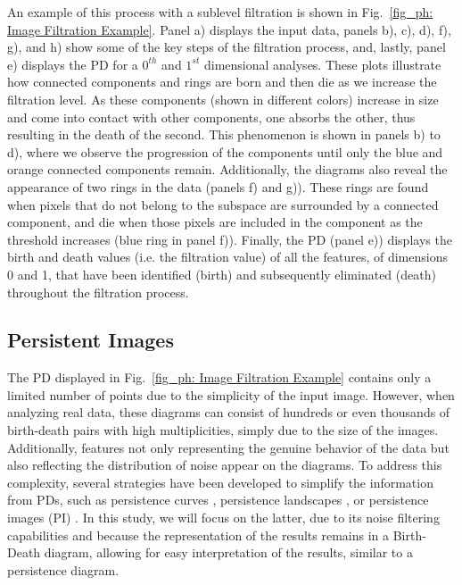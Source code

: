 \documentclass[12pt]{mythesis}
\begin{document}
An example of this process with a sublevel filtration is shown in Fig.~\ref{fig_ph: Image Filtration Example}. Panel a) displays the input data, panels b), c), d), f), g), and h) show some of the key steps of the filtration process, and, lastly, panel e) displays the PD for a $0^{th}$ and $1^{st}$ dimensional analyses. These plots illustrate how connected components and rings are born and then die as we increase the filtration level. As these components (shown in different colors) increase in size and come into contact with other components, one absorbs the other, thus resulting in the death of the second. This phenomenon is shown in panels b) to d), where we observe the progression of the components until only the blue and orange connected components remain. Additionally, the diagrams also reveal the appearance of two rings in the data (panels f) and g)). These rings are found when pixels that do not belong to the subspace are surrounded by a connected component, and die when those pixels are included in the component as the threshold increases (blue ring in panel f)). Finally, the PD (panel e)) displays the birth and death values (i.e. the filtration value) of all the features, of dimensions 0 and 1, that have been identified (birth) and subsequently eliminated (death) throughout the filtration process. 

\subsection{Persistent Images}

The PD displayed in Fig.~\ref{fig_ph: Image Filtration Example} contains only a limited number of points due to the simplicity of the input image. However, when analyzing real data, these diagrams can consist of hundreds or even thousands of birth-death pairs with high multiplicities, simply due to the size of the images. Additionally, features not only representing the genuine behavior of the data but also reflecting the distribution of noise appear on the diagrams. To address this complexity, several strategies have been developed to simplify the information from PDs, such as persistence curves  \citep{persistence_curves}, persistence landscapes \citep{persistence_landscapes}, or persistence images (PI) \citep{persistence_images}. In this study, we will focus on the latter, due to its noise filtering capabilities and because the representation of the results remains in a Birth-Death diagram, allowing for easy interpretation of the results, similar to a persistence diagram.
\end{document}
